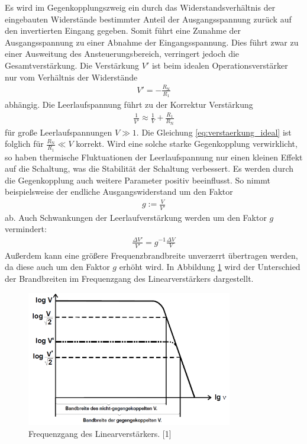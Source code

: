 \documentclass[]{scrartcl}
\begin{document}
Es wird im Gegenkopplungszweig ein durch das Widerstandsverhältnis der eingebauten Widerstände bestimmter Anteil der Ausgangsspannung zurück auf den invertierten Eingang gegeben. Somit führt eine Zunahme der Ausgangsspannung zu einer Abnahme der Eingangsspannung.
Dies führt zwar zu einer Ausweitung des Ansteuerungsbereich, verringert jedoch die Gesamtverstärkung.
Die Verstärkung $V'$ ist beim idealen Operationsverstärker nur vom Verhältnis der Widerstände
\begin{align}
V'=-\frac{R_{\text{N}}}{R_{1}}
\label{eq:verstaerkung_ideal}
\end{align}
abhängig.
Die Leerlaufspannung führt zu der Korrektur Verstärkung
\begin{align}
\frac{1}{V'}\approx \frac{1}{V} + \frac{R_{1}}{R_{\text{N}}}
\label{eq:leerlaufkorrektur}
\end{align}
für große Leerlaufspannungen $V \gg 1$. Die Gleichung \ref{eq:verstaerkung_ideal} ist folglich für $\frac{R_{\text{N}}}{R_{1}} \ll V$ korrekt.
Wird eine solche starke Gegenkopplung verwirklicht, so haben thermische Fluktuationen der Leerlaufspannung nur einen kleinen Effekt auf die Schaltung, was die Stabilität der Schaltung verbessert.
Es werden durch die Gegenkopplung auch weitere Parameter positiv beeinflusst. So nimmt beispielsweise der endliche Ausgangswiderstand um den Faktor
\begin{align}
g:=\frac{V}{V'}
\end{align}
ab. Auch Schwankungen der Leerlaufverstärkung werden um den Faktor $g$ vermindert:
\begin{align}
\frac{\Delta V'}{V'}=g^{-1}\frac{\Delta V}{V}
\end{align}
Außerdem kann eine größere Frequenzbrandbreite unverzerrt übertragen werden, da diese auch um den Faktor $g$ erhöht wird. In Abbildung \ref{fig:frequenzgang_operationsverstaerker} wird der Unterschied der Brandbreiten im Frequenzgang des Linearverstärkers dargestellt.
\begin{figure}[H]
\centering
\includegraphics[width=9cm]{images/frequenzgang_operationsverstaerker.png}
\caption{Frequenzgang des Linearverstärkers. [1]}
\label{fig:frequenzgang_operationsverstaerker}
\end{figure}
\end{document}
